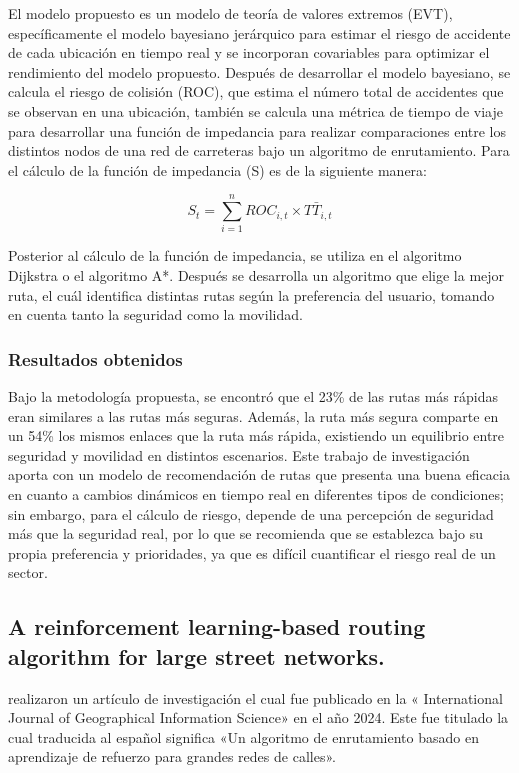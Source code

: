 El modelo propuesto es un modelo de teoría de valores extremos (EVT), específicamente el modelo bayesiano jerárquico para estimar el riesgo de accidente de cada ubicación en tiempo real y se incorporan covariables para optimizar el rendimiento del modelo propuesto. Después de desarrollar el modelo bayesiano, se calcula el riesgo de colisión (ROC), que estima el número total de accidentes que se observan en una ubicación, también se calcula una métrica de tiempo de viaje para desarrollar una función de impedancia para realizar comparaciones entre los distintos nodos de una red de carreteras bajo un algoritmo de enrutamiento. Para el cálculo de la función de impedancia (S) es de la siguiente manera:


\begin{equation} 
	S_{t} = \sum_{i=1}^{n}ROC_{i,t}\times T\bar{T}_{i,t}
\end{equation}


Posterior al cálculo de la función de impedancia, se utiliza en el algoritmo Dijkstra o el algoritmo A*. Después se desarrolla un algoritmo que elige la mejor ruta, el cuál identifica distintas rutas según la preferencia del usuario, tomando en cuenta tanto la seguridad como la movilidad.

\subsubsection{Resultados obtenidos}
Bajo la metodología propuesta, se encontró que el 23\% de las rutas más rápidas eran similares a las rutas más seguras. Además, la ruta más segura comparte en un 54\% los mismos enlaces que la ruta más rápida, existiendo un equilibrio entre seguridad y movilidad en distintos escenarios. Este trabajo de investigación aporta con un modelo de recomendación de rutas que presenta una buena eficacia en cuanto a cambios dinámicos en tiempo real en diferentes tipos de condiciones; sin embargo, para el cálculo de riesgo, depende de una percepción de seguridad más que la seguridad real, por lo que se recomienda que se establezca bajo su propia preferencia y prioridades, ya que es difícil cuantificar el riesgo real de un sector.

\subsection{A reinforcement learning-based routing algorithm for large street networks. \citep*{pr_diya}}
\citeauthor{pr_diya} realizaron un artículo de investigación el cual fue publicado en la « International Journal of Geographical Information Science» en el año 2024. Este fue titulado  la cual traducida al español significa «Un algoritmo de enrutamiento basado en aprendizaje de refuerzo para grandes redes de calles».

